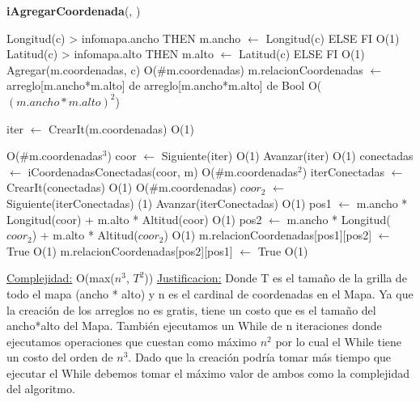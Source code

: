 \begin{Algoritmos}
\begin{algorithm}[H]{\textbf{iAgregarCoordenada}(, )}
	\begin{algorithmic}[1]
		\State \IF Longitud(c) > infomapa.ancho THEN m.ancho $\gets$ Longitud(c) ELSE FI \Comment O(1)
		\State \IF Latitud(c) > infomapa.alto THEN m.alto $\gets$ Latitud(c) ELSE FI \Comment O(1)
		\State Agregar(m.coordenadas, c) \Comment O($\#$m.coordenadas)
		\State m.relacionCoordenadas $\gets$ arreglo[m.ancho*m.alto] de arreglo[m.ancho*m.alto] de Bool \Comment O($(m.ancho*m.alto)^2$)


		\State iter $\gets$ CrearIt(m.coordenadas) \Comment O(1)
		
		 \Comment O($\#$m.coordenadas$^3$)
			\State coor $\gets$ Siguiente(iter) \Comment O(1)
			\State Avanzar(iter) \Comment O(1)
			\State conectadas $\gets$ iCoordenadasConectadas(coor, m) \Comment O($\#$m.coordenadas$^2$)
			\State iterConectadas $\gets$ CrearIt(conectadas) \Comment O(1)
			 \Comment O($\#$m.coordenadas)
				\State $coor_2$ $\gets$ Siguiente(iterConectadas) \Comment(1)
				\State Avanzar(iterConectadas) \Comment O(1)
				\State pos1 $\gets$ m.ancho * Longitud(coor) + m.alto * Altitud(coor) \Comment O(1)
				\State pos2 $\gets$ m.ancho * Longitud($coor_2$) + m.alto * Altitud($coor_2$) \Comment O(1)
				\State m.relacionCoordenadas[pos1][pos2] $\gets$ True \Comment O(1)
				\State m.relacionCoordenadas[pos2][pos1] $\gets$ True \Comment O(1)
			\EndWhile
		\EndWhile
		
		\medskip
		\Statex \underline{Complejidad:} O(max($n^3$, $T^2$))
		\Statex \underline{Justificacion:} Donde T es el tama\~no de la grilla de todo el mapa (ancho * alto) y n es el cardinal de coordenadas en el Mapa. Ya que la creaci\'on de los arreglos no es gratis, tiene un costo que es el tama\~no del ancho*alto del Mapa. Tambi\'en ejecutamos un While de n iteraciones donde ejecutamos operaciones que cuestan como m\'aximo $n^2$ por lo cual el While tiene un costo del orden de $n^3$. Dado que la creaci\'on podr\'ia tomar m\'as tiempo que ejecutar el While debemos tomar el m\'aximo valor de ambos como la complejidad del algoritmo.
	\end{algorithmic}
\end{algorithm}


\end{Algoritmos}
